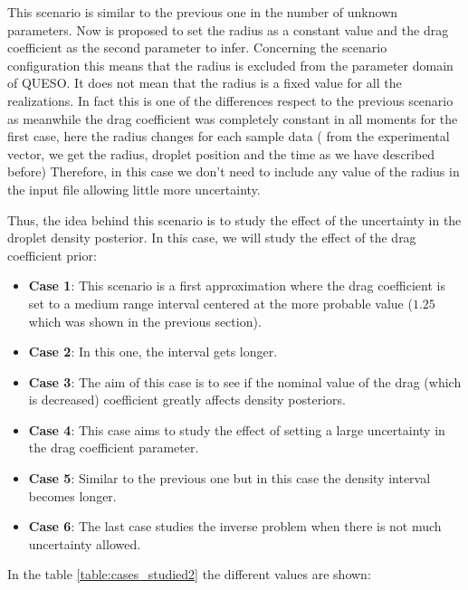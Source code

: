 \documentclass{article}
\begin{document}
This scenario is  similar to the previous one in the number of unknown parameters. Now  is proposed to set the radius as a constant value and the drag coefficient as the second parameter to infer. Concerning the scenario configuration this means that  the radius is excluded from the parameter domain of QUESO.
It does not mean that the radius is a fixed value for all the realizations. In fact this is one of the differences respect to the previous scenario as meanwhile the drag coefficient was completely constant in all  moments for the first case, here the radius changes for each sample data ( from the experimental vector, we get the radius, droplet position  and the time as we have described before)
Therefore,  in this case we don't need to  include any value of the radius in the input file allowing little more uncertainty.
 \par \noindent
Thus, the idea behind this scenario is to study the effect of the uncertainty in the droplet density posterior. In this case, we will study  the effect of the  drag coefficient prior:
\begin{itemize}
\item \textbf{ Case 1}: This scenario is a first approximation where the drag coefficient is set to a medium range interval centered at the more probable value ($1.25$ which was shown in the previous section).
\item \textbf{ Case 2}: In this one, the interval gets longer.
\item \textbf{ Case 3}: The aim of this case is to see if the nominal value of the drag (which is decreased) coefficient  greatly affects        			density posteriors.   
\item \textbf{ Case 4}: This case aims to study the effect of setting a large uncertainty in the drag coefficient parameter.
\item \textbf{ Case 5}: Similar to the previous one but in this case  the density interval  becomes  longer.
\item \textbf{ Case 6}: The last case studies the inverse problem when there is not much uncertainty allowed.
\end{itemize}

In the table \ref{table:cases_studied2} the different values are shown:
\end{document}
